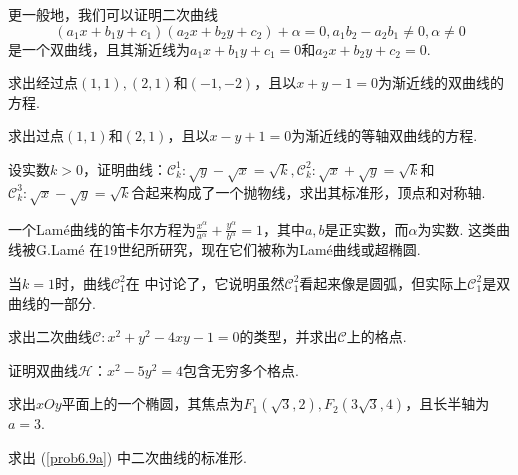\begin{remark}
  更一般地，我们可以证明二次曲线
  \[
    (a_1x + b_1y + c_1)(a_2x + b_2y + c_2) + \alpha = 0,a_1b_2 - a_2b_1\ne0,\alpha\ne0
  \]
  是一个双曲线，且其渐近线为$a_1x+b_1y+c_1=0$和$a_2x+b_2y+c_2=0$.
\end{remark}

\begin{problem}
  \begin{inparaenum}[(a)]
    \item 求出经过点$(1,1),(2,1)$和$(-1,-2)$，且以$x+y-1=0$为渐近线的双曲线的方程.

    \item 求出过点$(1,1)$和$(2,1)$，且以$x-y+1=0$为渐近线的等轴双曲线的方程.
  \end{inparaenum}
\end{problem}

\begin{mybox}
  \begin{problem}
  
    设实数$k>0$，证明曲线：$\mathscr C_k^1:\sqrt y - \sqrt x = \sqrt k,\mathscr C_k^2:\sqrt x+\sqrt y=\sqrt k$和$\mathscr C_k^3:\sqrt x-\sqrt y=\sqrt k$合起来构成了一个抛物线，求出其标准形，顶点和对称轴.
  \end{problem}
\end{mybox}

\begin{remark}
  一个{\kaishu Lam\'e曲线}的笛卡尔方程为$\frac{x^\alpha}{a^\alpha}+\frac{y^\alpha}{b^\alpha}=1$，其中$a,b$是正实数，而$\alpha$为实数. 这类曲线被G.Lam\'e \cite{39} 在19世纪所研究，现在它们被称为{\kaishu Lam\'e曲线}或{\kaishu 超椭圆}.

  当$k=1$时，曲线$\mathscr C_1^2$在 \cite{12} 中讨论了，它说明虽然$\mathscr C_1^2$看起来像是圆弧，但实际上$\mathscr C_1^2$是双曲线的一部分.
\end{remark}

\begin{problem}
  求出二次曲线$\mathscr C:x^2+y^2-4xy-1=0$的类型，并求出$\mathscr C$上的格点.
\end{problem}

\begin{problem}
  证明双曲线$\mathscr H$：$x^2-5y^2=4$包含无穷多个格点.
\end{problem}

\begin{problem}
  \begin{inparaenum}[(a)]
    \item\label{prob6.9a} 求出$xOy$平面上的一个椭圆，其焦点为$F_1(\sqrt3,2),F_2(3\sqrt3,4)$，且长半轴为$a=3$.

    \item 求出 (\ref{prob6.9a}) 中二次曲线的标准形.
  \end{inparaenum}
\end{problem}

